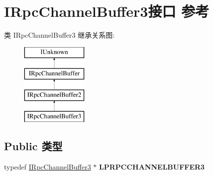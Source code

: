 \hypertarget{interface_i_rpc_channel_buffer3}{}\section{I\+Rpc\+Channel\+Buffer3接口 参考}
\label{interface_i_rpc_channel_buffer3}
类 I\+Rpc\+Channel\+Buffer3 继承关系图\+:\begin{figure}[H]
\begin{center}
\leavevmode
\includegraphics[height=4.000000cm]{interface_i_rpc_channel_buffer3}
\end{center}
\end{figure}
\subsection*{Public 类型}
\begin{DoxyCompactItemize}
\item 
\mbox{\label{interface_i_rpc_channel_buffer3_a978bacab1c5826547217dd2e05859236}} 
typedef \hyperlink{interface_i_rpc_channel_buffer3}{I\+Rpc\+Channel\+Buffer3} $\ast$ {\bfseries L\+P\+R\+P\+C\+C\+H\+A\+N\+N\+E\+L\+B\+U\+F\+F\+E\+R3}
\end{DoxyCompactItemize}
